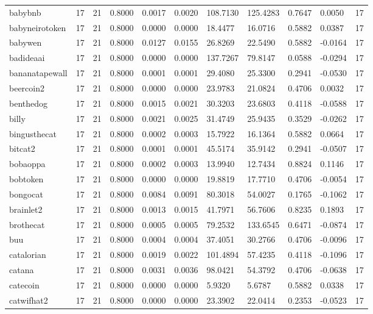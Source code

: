 \begin{table}[htbp]
\begin{tabular}{lllllllllll}
babybnb & 17 & 21 & 0.8000 & 0.0017 & 0.0020 & 108.7130 & 125.4283 & 0.7647 & 0.0050 & 17 \\
babyneirotoken & 17 & 21 & 0.8000 & 0.0000 & 0.0000 & 18.4477 & 16.0716 & 0.5882 & 0.0387 & 17 \\
babywen & 17 & 21 & 0.8000 & 0.0127 & 0.0155 & 26.8269 & 22.5490 & 0.5882 & -0.0164 & 17 \\
badideaai & 17 & 21 & 0.8000 & 0.0000 & 0.0000 & 137.7267 & 79.8147 & 0.0588 & -0.0294 & 17 \\
bananatapewall & 17 & 21 & 0.8000 & 0.0001 & 0.0001 & 29.4080 & 25.3300 & 0.2941 & -0.0530 & 17 \\
beercoin2 & 17 & 21 & 0.8000 & 0.0000 & 0.0000 & 23.9783 & 21.0824 & 0.4706 & 0.0032 & 17 \\
benthedog & 17 & 21 & 0.8000 & 0.0015 & 0.0021 & 30.3203 & 23.6803 & 0.4118 & -0.0588 & 17 \\
billy & 17 & 21 & 0.8000 & 0.0021 & 0.0025 & 31.4749 & 25.9435 & 0.3529 & -0.0262 & 17 \\
bingusthecat & 17 & 21 & 0.8000 & 0.0002 & 0.0003 & 15.7922 & 16.1364 & 0.5882 & 0.0664 & 17 \\
bitcat2 & 17 & 21 & 0.8000 & 0.0001 & 0.0001 & 45.5174 & 35.9142 & 0.2941 & -0.0507 & 17 \\
bobaoppa & 17 & 21 & 0.8000 & 0.0002 & 0.0003 & 13.9940 & 12.7434 & 0.8824 & 0.1146 & 17 \\
bobtoken & 17 & 21 & 0.8000 & 0.0000 & 0.0000 & 19.8819 & 17.7710 & 0.4706 & -0.0054 & 17 \\
bongocat & 17 & 21 & 0.8000 & 0.0084 & 0.0091 & 80.3018 & 54.0027 & 0.1765 & -0.1062 & 17 \\
brainlet2 & 17 & 21 & 0.8000 & 0.0013 & 0.0015 & 41.7971 & 56.7606 & 0.8235 & 0.1893 & 17 \\
brothecat & 17 & 21 & 0.8000 & 0.0005 & 0.0005 & 79.2532 & 133.6545 & 0.6471 & -0.0874 & 17 \\
buu & 17 & 21 & 0.8000 & 0.0004 & 0.0004 & 37.4051 & 30.2766 & 0.4706 & -0.0096 & 17 \\
catalorian & 17 & 21 & 0.8000 & 0.0019 & 0.0022 & 101.4894 & 57.4235 & 0.4118 & -0.1096 & 17 \\
catana & 17 & 21 & 0.8000 & 0.0031 & 0.0036 & 98.0421 & 54.3792 & 0.4706 & -0.0638 & 17 \\
catecoin & 17 & 21 & 0.8000 & 0.0000 & 0.0000 & 5.9320 & 5.6787 & 0.5882 & 0.0338 & 17 \\
catwifhat2 & 17 & 21 & 0.8000 & 0.0000 & 0.0000 & 23.3902 & 22.0414 & 0.2353 & -0.0523 & 17 \\

\end{tabular}
\end{table}

